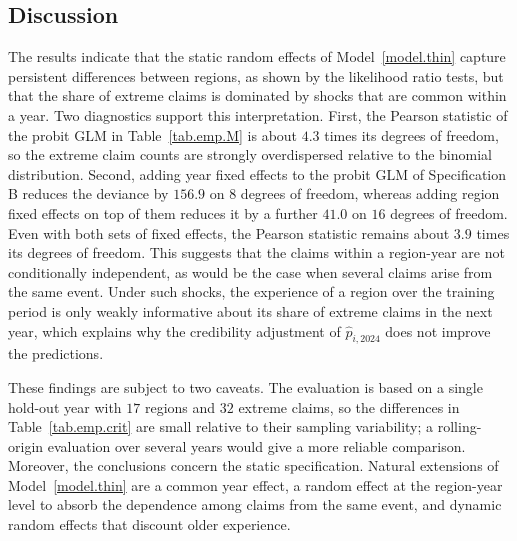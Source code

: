 \subsection{Discussion}
\label{sec.emp.discussion}

The results indicate that the static random effects of
Model~\ref{model.thin} capture persistent differences between regions,
as shown by the likelihood ratio tests, but that the share of extreme
claims is dominated by shocks that are common within a year. Two
diagnostics support this interpretation. First, the Pearson statistic of
the probit GLM in Table~\ref{tab.emp.M} is about \(4.3\) times its
degrees of freedom, so the extreme claim counts are strongly
overdispersed relative to the binomial distribution. Second, adding
year fixed effects to the probit GLM of Specification B reduces the
deviance by \(156.9\) on \(8\) degrees of freedom, whereas adding region
fixed effects on top of them reduces it by a further \(41.0\) on \(16\)
degrees of freedom. Even with both sets of fixed effects, the Pearson
statistic remains about \(3.9\) times its degrees of freedom. This
suggests that the claims within a region-year are not conditionally
independent, as would be the case when several claims arise from the
same event. Under such shocks, the experience of a region over the
training period is only weakly informative about its share of extreme
claims in the next year, which explains why the credibility adjustment
of \(\widehat p_{i,2024}\) does not improve the predictions.

These findings are subject to two caveats. The evaluation is based on a
single hold-out year with \(17\) regions and \(32\) extreme claims, so
the differences in Table~\ref{tab.emp.crit} are small relative to their
sampling variability; a rolling-origin evaluation over several years
would give a more reliable comparison. Moreover, the conclusions concern
the static specification. Natural extensions of
Model~\ref{model.thin} are a common year effect, a random effect at the
region-year level to absorb the dependence among claims from the same
event, and dynamic random effects that discount older experience.
